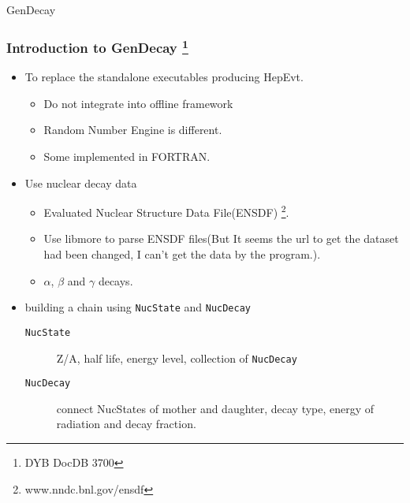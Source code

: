 \begin{frame}
    \begin{center}
        \LARGE GenDecay
    \end{center}
\end{frame}

\begin{frame}
    \frametitle{Introduction to GenDecay
                \footnote{DYB DocDB 3700}}
    \begin{itemize}
        \item To replace the standalone executables producing HepEvt.
            \begin{itemize}
                \item Do not integrate into offline framework
                \item Random Number Engine is different.
                \item Some implemented in FORTRAN.
            \end{itemize}
        \item Use nuclear decay data
            \begin{itemize}
                \item Evaluated Nuclear Structure Data File(ENSDF)
                        \footnote{www.nndc.bnl.gov/ensdf}.
                \item Use libmore to parse ENSDF files(But It seems the url to
                        get the dataset had been changed, I can't get the data
                        by the program.).
                \item $\alpha$, $\beta$ and $\gamma$ decays.
                \end{itemize}
        \item building a chain using {\tt NucState} and {\tt NucDecay}
            \begin{description}
                \item[{\tt NucState}] Z/A, half life, energy level, collection
                    of {\tt NucDecay}
                \item[{\tt NucDecay}] connect NucStates of mother and daughter,
                    decay type, energy of radiation and decay fraction.
            \end{description}
    \end{itemize}
\end{frame}

